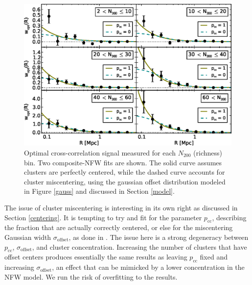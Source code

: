 \begin{figure}
\begin{center}
\includegraphics[scale=0.9]{plots_ch3/wopt_panel_fcc0and1_U.eps}
\caption[Magnification for Richness-Binned Clusters]{Optimal cross-correlation signal measured for each $N_{200}$ (richness) bin. Two composite-NFW fits are shown. The solid curve assumes clusters are perfectly centered, while the dashed curve accounts for cluster miscentering, using the gaussian offset distribution modeled in Figure \ref{gauss} and discussed in Section \ref{model}.}
\label{binned}
\end{center}
\end{figure}

The issue of cluster miscentering is interesting in its own right as discussed in Section \ref{centering}. It is tempting to try and fit for the parameter $p_{\mathrm{cc}}$, describing the fraction that are actually correctly centered, or else for the miscentering Gaussian width $\sigma_{\mathrm{offset}}$, as done in \citet{Johnston07}. The issue here is a strong degeneracy between $p_{\mathrm{cc}}$, $\sigma_{\mathrm{offset}}$, and cluster concentration. Increasing the number of clusters that have offset centers produces essentially the same results as leaving $p_{\mathrm{cc}}$ fixed and increasing $\sigma_{\mathrm{offset}}$, an effect that can be mimicked by a lower concentration in the NFW model. We run the risk of overfitting to the results. 

